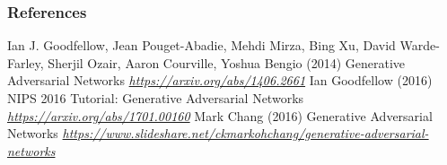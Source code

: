 %

%


\begin{vbframe}
\frametitle{References}
\footnotesize{
\begin{thebibliography}{99}
 Ian J. Goodfellow, Jean Pouget-Abadie, Mehdi Mirza, Bing Xu, David Warde-Farley, Sherjil Ozair, Aaron Courville, Yoshua Bengio (2014)
\newblock Generative Adversarial Networks
\newblock \emph{\url{https://arxiv.org/abs/1406.2661}}
 Ian Goodfellow (2016)
\newblock NIPS 2016 Tutorial: Generative Adversarial Networks
\newblock \emph{\url{https://arxiv.org/abs/1701.00160}}
 Mark Chang (2016)
\newblock Generative Adversarial Networks
\newblock \emph{\url{https://www.slideshare.net/ckmarkohchang/generative-adversarial-networks}}


\end{thebibliography}
}
\end{vbframe}

\endlecture

